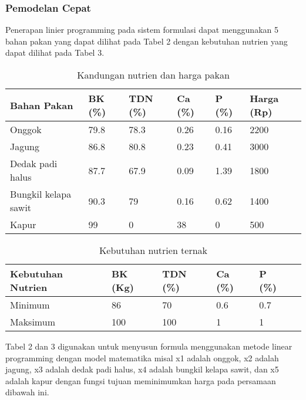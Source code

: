 \subsubsection*{Pemodelan Cepat}
Penerapan linier programming pada sistem formulasi dapat menggunakan 5 bahan pakan yang dapat dilihat pada Tabel 2 dengan kebutuhan nutrien yang dapat dilihat pada Tabel 3.

\begin{table}[h!]
	\centering
	\caption{Kandungan nutrien dan harga pakan}
	\label{my-label}
	\begin{tabular}{p{2cm}p{0.75cm}p{0.75cm}p{0.75cm}p{0.75cm}p{1cm}}
		\hline
		Bahan Pakan          & BK (\%) & TDN (\%) & Ca (\%) & P (\%) & Harga (Rp) \\ \hline
		Onggok               & 79.8    & 78.3     & 0.26    & 0.16   & 2200          \\ 
		Jagung               & 86.8    & 80.8     & 0.23    & 0.41   & 3000          \\ 
		Dedak padi halus     & 87.7    & 67.9     & 0.09    & 1.39   & 1800          \\ 
		Bungkil kelapa sawit & 90.3    & 79       & 0.16    & 0.62   & 1400          \\ 
		Kapur                & 99      & 0        & 38      & 0      & 500           \\ \hline
	\end{tabular}
\end{table}

\begin{table}[h!]
	\centering
	\caption{Kebutuhan nutrien ternak}
	\label{my-label}
	\begin{tabular}{p{2cm}p{0.75cm}p{0.75cm}p{0.75cm}p{0.75cm}p{1cm}}
		\hline
		Kebutuhan Nutrien & BK (Kg) & TDN (\%) & Ca (\%) & P (\%) \\ \hline
		Minimum           & 86      & 70       & 0.6     & 0.7    \\
		Maksimum          & 100     & 100      & 1       & 1      \\ \hline
	\end{tabular}
\end{table}

Tabel 2 dan 3 digunakan untuk menyusun formula menggunakan metode linear programming dengan model matematika misal x1 adalah onggok, x2 adalah jagung, x3 adalah dedak padi halus, x4 adalah bungkil kelapa sawit, dan x5 adalah kapur dengan fungsi tujuan meminimumkan harga pada persamaan dibawah ini.

